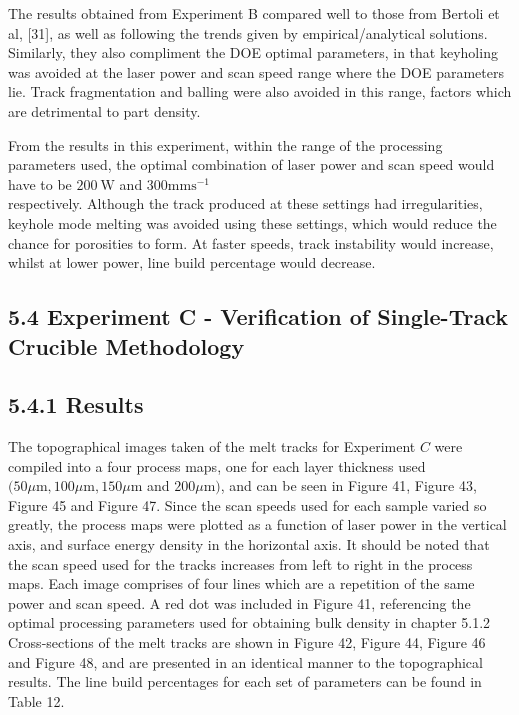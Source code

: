\documentclass[10pt]{article}
\begin{document}
The results obtained from Experiment B compared well to those from Bertoli et al, [31], as well as following the trends given by empirical/analytical solutions. Similarly, they also compliment the DOE optimal parameters, in that keyholing was avoided at the laser power and scan speed range where the DOE parameters lie. Track fragmentation and balling were also avoided in this range, factors which are detrimental to part density.

From the results in this experiment, within the range of the processing parameters used, the optimal combination of laser power and scan speed would have to be $200 \mathrm{~W}$ and $300 \mathrm{mms}^{-1}$\\
respectively. Although the track produced at these settings had irregularities, keyhole mode melting was avoided using these settings, which would reduce the chance for porosities to form. At faster speeds, track instability would increase, whilst at lower power, line build percentage would decrease.

\subsection*{5.4 Experiment C - Verification of Single-Track Crucible Methodology}
\subsection*{5.4.1 Results}
The topographical images taken of the melt tracks for Experiment $C$ were compiled into a four process maps, one for each layer thickness used $(50 \mu \mathrm{m}, 100 \mu \mathrm{m}, 150 \mu \mathrm{m}$ and $200 \mu \mathrm{m})$, and can be seen in Figure 41, Figure 43, Figure 45 and Figure 47. Since the scan speeds used for each sample varied so greatly, the process maps were plotted as a function of laser power in the vertical axis, and surface energy density in the horizontal axis. It should be noted that the scan speed used for the tracks increases from left to right in the process maps. Each image comprises of four lines which are a repetition of the same power and scan speed. A red dot was included in Figure 41, referencing the optimal processing parameters used for obtaining bulk density in chapter 5.1.2 Cross-sections of the melt tracks are shown in Figure 42, Figure 44, Figure 46 and Figure 48, and are presented in an identical manner to the topographical results. The line build percentages for each set of parameters can be found in Table 12.
\end{document}
